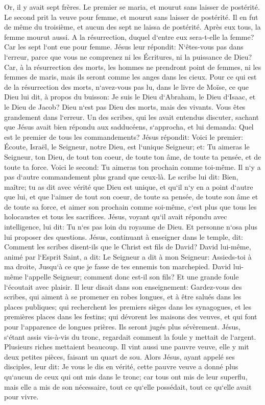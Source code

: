 \verse Or, il y avait sept frères. Le premier se maria, et mourut sans laisser de postérité. 
\verse Le second prit la veuve pour femme, et mourut sans laisser de postérité. Il en fut de même du troisième, 
\verse et aucun des sept ne laissa de postérité. Après eux tous, la femme mourut aussi. 
\verse A la résurrection, duquel d`entre eux sera-t-elle la femme? Car les sept l`ont eue pour femme. 
\verse Jésus leur répondit: N`êtes-vous pas dans l`erreur, parce que vous ne comprenez ni les Écritures, ni la puissance de Dieu? 
\verse Car, à la résurrection des morts, les hommes ne prendront point de femmes, ni les femmes de maris, mais ils seront comme les anges dans les cieux. 
\verse Pour ce qui est de la résurrection des morts, n`avez-vous pas lu, dans le livre de Moïse, ce que Dieu lui dit, à propos du buisson: Je suis le Dieu d`Abraham, le Dieu d`Isaac, et le Dieu de Jacob? 
\verse Dieu n`est pas Dieu des morts, mais des vivants. Vous êtes grandement dans l`erreur. 
\verse Un des scribes, qui les avait entendus discuter, sachant que Jésus avait bien répondu aux sadducéens, s`approcha, et lui demanda: Quel est le premier de tous les commandements? 
\verse Jésus répondit: Voici le premier: Écoute, Israël, le Seigneur, notre Dieu, est l`unique Seigneur; 
\verse et: Tu aimeras le Seigneur, ton Dieu, de tout ton coeur, de toute ton âme, de toute ta pensée, et de toute ta force. 
\verse Voici le second: Tu aimeras ton prochain comme toi-même. Il n`y a pas d`autre commandement plus grand que ceux-là. 
\verse Le scribe lui dit: Bien, maître; tu as dit avec vérité que Dieu est unique, et qu`il n`y en a point d`autre que lui, 
\verse et que l`aimer de tout son coeur, de toute sa pensée, de toute son âme et de toute sa force, et aimer son prochain comme soi-même, c`est plus que tous les holocaustes et tous les sacrifices. 
\verse Jésus, voyant qu`il avait répondu avec intelligence, lui dit: Tu n`es pas loin du royaume de Dieu. Et personne n`osa plus lui proposer des questions. 
\verse Jésus, continuant à enseigner dans le temple, dit: Comment les scribes disent-ils que le Christ est fils de David? 
\verse David lui-même, animé par l`Esprit Saint, a dit: Le Seigneur a dit à mon Seigneur: Assieds-toi à ma droite, Jusqu`à ce que je fasse de tes ennemis ton marchepied. 
\verse David lui-même l`appelle Seigneur; comment donc est-il son fils? Et une grande foule l`écoutait avec plaisir. 
\verse Il leur disait dans son enseignement: Gardez-vous des scribes, qui aiment à se promener en robes longues, et à être salués dans les places publiques; 
\verse qui recherchent les premiers sièges dans les synagogues, et les premières places dans les festins; 
\verse qui dévorent les maisons des veuves, et qui font pour l`apparence de longues prières. Ils seront jugés plus sévèrement. 
\verse Jésus, s`étant assis vis-à-vis du tronc, regardait comment la foule y mettait de l`argent. Plusieurs riches mettaient beaucoup. 
\verse Il vint aussi une pauvre veuve, elle y mit deux petites pièces, faisant un quart de sou. 
\verse Alors Jésus, ayant appelé ses disciples, leur dit: Je vous le dis en vérité, cette pauvre veuve a donné plus qu`aucun de ceux qui ont mis dans le tronc; 
\verse car tous ont mis de leur superflu, mais elle a mis de son nécessaire, tout ce qu`elle possédait, tout ce qu`elle avait pour vivre. 

